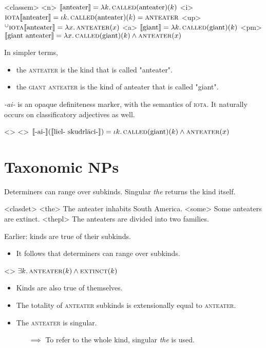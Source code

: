 \documentclass[a4paper,12pt]{article}
\begin{document}
\pex<classem>
    \a<n> $\llbracket \text{anteater} \rrbracket = \lambda k.\,\textsc{called}(\text{anteater})(k)$
    \a<i> $\textsc{iota}\llbracket \text{anteater} \rrbracket = \iota k.\,\textsc{called}(\text{anteater})(k) = \textsc{anteater}$
    \a<up> $^\cup \textsc{iota}\llbracket \text{anteater} \rrbracket = \lambda x.\,\textsc{anteater}(x)$
    \a<a> $\llbracket \text{giant} \rrbracket  = \lambda k.\,\textsc{called}(\text{giant})(k)$
    \a<pm> $\llbracket \text{giant anteater} \rrbracket = \lambda x.\,\textsc{called}(\text{giant})(k) \land \textsc{anteater}(x)$
\xe

In simpler terms,
\begin{itemize}
    \item the \textsc{anteater} is the kind that is called "anteater".
    \item the \textsc{giant anteater} is the kind of anteater that is called "giant".
\end{itemize}

\textit{-ai-} is an opaque definiteness marker, with the semantics of \textsc{iota}. It naturally occurs on classificatory adjectives as well.

\pex<>
    \a<> $\llbracket \text{-ai-} \rrbracket (\llbracket  \text{liel- skudrlāci-}\rrbracket ) =  \iota k.\,\textsc{called}(\text{giant})(k) \land \textsc{anteater}(x)$
\xe

\section{Taxonomic NPs}

Determiners can range over subkinds. Singular \textit{the} returns the kind itself.

\pex<clasdet>
    \a<the> The anteater inhabits South America.
    \a<some> Some anteaters are extinct.
    \a<thepl> The anteaters are divided into two families.
\xe

Earlier: kinds are true of their subkinds.

\begin{itemize}
    \item It follows that determiners can range over subkinds.
\end{itemize}

\ex<>
    $\exists k.\,\textsc{anteater}(k) \land \textsc{extinct}(k)$
\xe

\begin{itemize}
    \item Kinds are also true of themselves.
    \item The totality of \textsc{anteater} subkinds is extensionally equal to \textsc{anteater}.
    \item The \textsc{anteater} is singular.
    \begin{itemize}
        \item[$\implies$] To refer to the whole kind, singular \textit{the} is used.
    \end{itemize}
\end{itemize}
\end{document}
